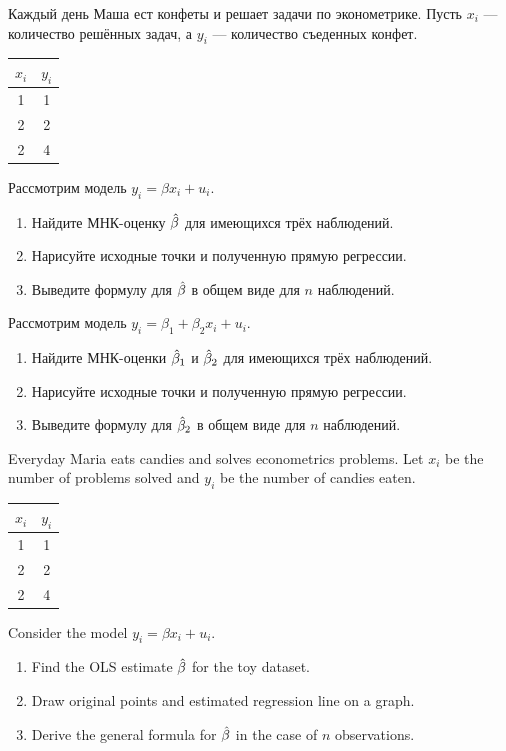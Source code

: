 \begin{problem}
\begin{translation-ru}
Каждый день Маша ест конфеты и решает задачи по эконометрике. Пусть $x_i$ — количество решённых задач, а $y_i$ — количество съеденных конфет.

\begin{tabular}{cc}
\toprule
$x_i$ & $y_i$ \\
\midrule
1 & 1 \\
2 & 2 \\
2 & 4 \\
\bottomrule
\end{tabular}

Рассмотрим модель $y_i = \beta x_i + u_i$.

\begin{enumerate}
\item Найдите МНК-оценку $\hat{\beta}$ для имеющихся трёх наблюдений.
\item Нарисуйте исходные точки и полученную прямую регрессии.
\item Выведите формулу для $\hat{\beta}$ в общем виде для $n$ наблюдений.
\end{enumerate}

Рассмотрим модель $y_i = \beta_1 + \beta_2 x_i + u_i$.
\begin{enumerate}[resume]
\item Найдите МНК-оценки $\hat{\beta}_1$ и $\hat{\beta}_2$ для имеющихся трёх наблюдений.
\item Нарисуйте исходные точки и полученную прямую регрессии.
\item Выведите формулу для $\hat{\beta}_2$ в общем виде для $n$ наблюдений.
\end{enumerate}
\end{translation-ru}

\begin{translation-en}
Everyday Maria eats candies and solves econometrics problems.
Let $x_i$ be the number of problems solved and $y_i$ be the number of candies eaten.

\begin{tabular}{cc}
\toprule
$x_i$ & $y_i$ \\
\midrule
1 & 1 \\
2 & 2 \\
2 & 4 \\
\bottomrule
\end{tabular}

Consider the model $y_i = \beta x_i + u_i$.

\begin{enumerate}
\item Find the OLS estimate $\hat{\beta}$ for the toy dataset.
\item Draw original points and estimated regression line on a graph.
\item Derive the general formula for $\hat{\beta}$ in the case of $n$ observations.
\end{enumerate}


\end{translation-en}
\end{problem}

